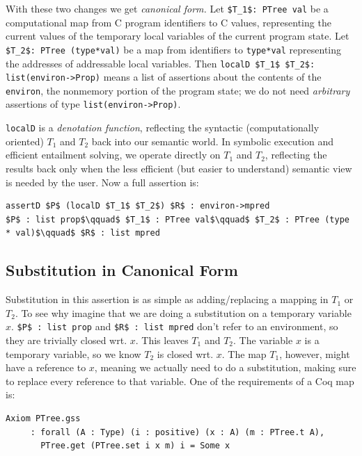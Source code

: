 \documentclass{puthesis}
\begin{document}
With these two changes we get \emph{canonical form.}  Let
\lstinline{$T_1$: PTree val} be a computational map from C program
identifiers to C values, representing the current values of the
temporary local variables of the current program state. Let
\lstinline{$T_2$: PTree (type*val)} be a map from identifiers to
\lstinline{type*val} representing the addresses of addressable local
variables.  Then \lstinline{localD $T_1$ $T_2$: list(environ->Prop)}
means a list of assertions about the contents of the
\lstinline{environ}, the nonmemory portion of the program state; we do
not need \emph{arbitrary} assertions of type
\lstinline{list(environ->Prop)}.

\lstinline{localD} is a \emph{denotation function}, reflecting the
syntactic (computationally oriented) $T_1$ and $T_2$ back into our
semantic world.  In symbolic execution and efficient entailment
solving, we operate directly on $T_1$ and $T_2$, reflecting the
results back only when the less efficient (but easier to understand)
semantic view is needed by the user. Now a full assertion is:

\begin{lstlisting}
assertD $P$ (localD $T_1$ $T_2$) $R$ : environ->mpred
$P$ : list prop$\qquad$ $T_1$ : PTree val$\qquad$ $T_2$ : PTree (type * val)$\qquad$ $R$ : list mpred
\end{lstlisting}

\subsection{Substitution in Canonical Form}

Substitution in this assertion is as simple as adding/replacing a
mapping in $T_1$ or $T_2$. To see why imagine that we are doing a
substitution on a temporary variable $x$.  \lstinline|$P$ : list prop|
and \lstinline|$R$ : list mpred| don't refer to an environment, so
they are trivially closed wrt.  $x$. This leaves $T_1$ and $T_2$. The
variable $x$ is a temporary variable, so we know $T_2$ is closed
wrt. $x$.  The map $T_1$, however, might have a reference to $x$,
meaning we actually need to do a substitution, making sure to replace
every reference to that variable. One of the requirements of a Coq map
is:

\begin{verbatim}
Axiom PTree.gss
     : forall (A : Type) (i : positive) (x : A) (m : PTree.t A),
       PTree.get (PTree.set i x m) i = Some x
\end{verbatim}
\end{document}
